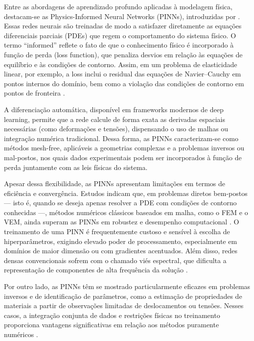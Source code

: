 \documentclass[12pt,openright,oneside,a4paper,english,brazil]{abntex2}
\begin{document}
Entre as abordagens de aprendizado profundo aplicadas à modelagem física, destacam-se as Physics-Informed Neural Networks (PINNs), introduzidas por \textcite{raissi2019}. Essas redes neurais são treinadas de modo a satisfazer diretamente as equações diferenciais parciais (PDEs) que regem o comportamento do sistema físico. O termo “informed” reflete o fato de que o conhecimento físico é 
incorporado à função de perda (loss function), que penaliza desvios em relação às equações de equilíbrio e às condições de contorno. Assim, em um problema de elasticidade linear, por exemplo, a loss inclui o residual das equações de Navier–Cauchy em pontos internos do domínio, bem como a violação das condições de contorno em pontos de fronteira \cite{lu2021}.

A diferenciação automática, disponível em frameworks modernos de deep learning, permite que a rede calcule de forma exata as derivadas espaciais necessárias (como deformações e tensões), dispensando o uso de malhas ou integração numérica tradicional. Dessa forma, as PINNs caracterizam-se como métodos mesh-free, aplicáveis a geometrias complexas e a problemas inversos ou mal-postos, nos quais 
dados experimentais podem ser incorporados à função de perda juntamente com as leis físicas do sistema.

Apesar dessa flexibilidade, as PINNs apresentam limitações em termos de eficiência e convergência. Estudos indicam que, em problemas diretos bem-postos — isto é, quando se deseja apenas resolver a PDE com condições de contorno conhecidas —, métodos numéricos clássicos baseados em malha, como o FEM e o VEM, ainda superam as PINNs em robustez e desempenho 
computacional \cite{karniadakis2021, lu2021}. O treinamento de uma PINN é frequentemente custoso e sensível à escolha de hiperparâmetros, exigindo elevado poder de processamento, especialmente em domínios de maior dimensão ou com gradientes acentuados. Além disso, redes densas convencionais sofrem com o chamado viés espectral, que dificulta a representação de componentes de alta 
frequência da solução \cite{wang2021}.

Por outro lado, as PINNs têm se mostrado particularmente eficazes em problemas inversos e de identificação de parâmetros, como a estimação de propriedades de materiais a partir de observações limitadas de deslocamentos ou tensões. Nesses casos, a integração conjunta de dados e restrições físicas no treinamento proporciona vantagens significativas em relação aos métodos puramente 
numéricos \cite{karniadakis2021}.
\end{document}
